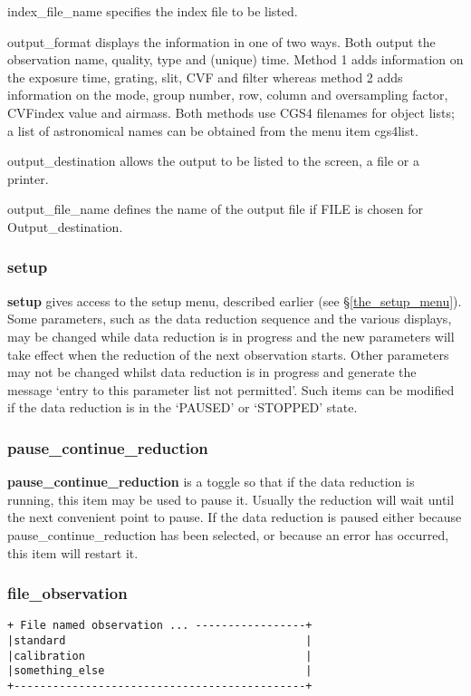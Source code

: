 {{\sf index\_file\_name} specifies the index file to be listed.

{\sf output\_format} displays the information in one of two ways. Both
output the observation name, quality, type and (unique) time. Method 1 adds
information on the exposure time, grating, slit, CVF and filter whereas method 
2 adds information on the mode, group number, row, column and oversampling 
factor, CVFindex value and airmass. Both methods use CGS4 filenames for object 
lists; a list of astronomical names can be obtained from the menu item 
{\sf cgs4list}.

{\sf output\_destination} allows the output to be listed to the screen,
a file or a printer. 

{\sf output\_file\_name} defines the name of the output file if  {\sf FILE}
is chosen for {\sf Output\_destination}.

\subsubsection{setup}
\label{setup}

{\bf setup} gives access to the {\sf setup} menu, described 
earlier (see \S \ref{the_setup_menu}). Some parameters, such as the data 
reduction sequence and the various displays, may be changed while data 
reduction is in progress and the new parameters will take effect when 
the reduction of the next observation starts. Other parameters may not be
changed whilst data reduction is in progress and generate the message
{\sf `entry to this parameter list not permitted'}. Such items can be
modified if the data reduction is in the {\sf `PAUSED'} or {\sf `STOPPED'}
state.

\subsubsection{pause\_continue\_reduction}
\label{pause_continue_reduction}

{\bf pause\_continue\_reduction} is a toggle so that if the data reduction 
is running, this item may be used to pause it. Usually the reduction will wait 
until the next convenient point to pause. If the data reduction is 
paused either because {\sf pause\_continue\_reduction} has been selected, 
or because an error has occurred, this item will restart it.
 
\subsubsection{file\_observation}
\label{file_observation}
\begin{verbatim}
+ File named observation ... -----------------+
|standard                                     |
|calibration                                  |
|something_else                               |
+---------------------------------------------+
\end{verbatim}

}

